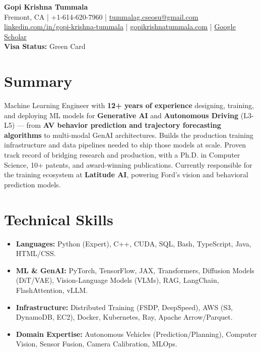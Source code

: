 \documentclass[10pt,letterpaper]{article}
\begin{document}
\begin{center}
    {\Huge \textbf{Gopi Krishna Tummala}} \\ [6pt]
    \large
    \faMapMarker* Fremont, CA \quad | \quad
    \faPhone* +1-614-620-7960 \quad | \quad
    \faEnvelope* \href{mailto:tummalag.cseosu@gmail.com}{tummalag.cseosu@gmail.com} \\ [4pt]
    \small
    \faLinkedin \href{https://www.linkedin.com/in/gopi-krishna-tummala-00294415/}{ linkedin.com/in/gopi-krishna-tummala} \quad | \quad
    \faGlobe \href{https://gopikrishnatummala.com/}{ gopikrishnatummala.com} \quad | \quad
    \faGraduationCap \href{https://scholar.google.com/citations?user=SaKqqO8AAAAJ&hl=en}{ Google Scholar} \\ [4pt]
    \textbf{Visa Status:} Green Card
\end{center}

\section{Summary}
Machine Learning Engineer with \textbf{12+ years of experience} designing, training, and deploying ML models for \textbf{Generative AI} and \textbf{Autonomous Driving} (L3-L5) — from \textbf{AV behavior prediction and trajectory forecasting algorithms} to multi-modal GenAI architectures. Builds the production training infrastructure and data pipelines needed to ship those models at scale. Proven track record of bridging research and production, with a Ph.D. in Computer Science, 10+ patents, and award-winning publications. Currently responsible for the training ecosystem at \textbf{Latitude AI}, powering Ford's vision and behavioral prediction models.

\section{Technical Skills}
\begin{itemize}
    \item \textbf{Languages:} Python (Expert), C++, CUDA, SQL, Bash, TypeScript, Java, HTML/CSS.
    \item \textbf{ML \& GenAI:} PyTorch, TensorFlow, JAX, Transformers, Diffusion Models (DiT/VAE), Vision-Language Models (VLMs), RAG, LangChain, FlashAttention, vLLM.
    \item \textbf{Infrastructure:} Distributed Training (FSDP, DeepSpeed), AWS (S3, DynamoDB, EC2), Docker, Kubernetes, Ray, Apache Arrow/Parquet.
    \item \textbf{Domain Expertise:} Autonomous Vehicles (Prediction/Planning), Computer Vision, Sensor Fusion, Camera Calibration, MLOps.
\end{itemize}
\end{document}
